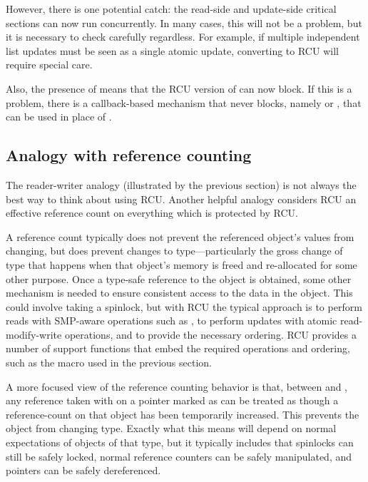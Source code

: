 However, there is one potential catch{:} the read-side and update-side
critical sections can now run concurrently.
In many cases, this will
not be a problem, but it is necessary to check carefully regardless.
For example, if multiple independent list updates must be seen as
a single atomic update, converting to RCU will require special care.

Also, the presence of  means that the RCU version of
 can now block.
If this is a problem, there is a callback-based
mechanism that never blocks, namely  or , that can
be used in place of .


\subsection{Analogy with reference counting}
\label{sec:rcu:Analogy with reference counting}

The reader-writer analogy (illustrated by the previous section) is not
always the best way to think about using RCU\@.
Another helpful analogy
considers RCU an effective reference count on everything which is
protected by RCU\@.

A reference count typically does not prevent the referenced object's
values from changing, but does prevent changes to type---particularly the
gross change of type that happens when that object's memory is freed and
re-allocated for some other purpose.
Once a type-safe reference to the
object is obtained, some other mechanism is needed to ensure consistent
access to the data in the object.
This could involve taking a spinlock,
but with RCU the typical approach is to perform reads with SMP-aware
operations such as , to perform updates with atomic
read-modify-write operations, and to provide the necessary ordering.
RCU provides a number of support functions that embed the required
operations and ordering, such as the  macro
used in the previous section.

A more focused view of the reference counting behavior is that,
between  and , any reference taken with
 on a pointer marked as  can be treated as
though a reference-count on that object has been temporarily increased.
This prevents the object from changing type.
Exactly what this means
will depend on normal expectations of objects of that type, but it
typically includes that spinlocks can still be safely locked, normal
reference counters can be safely manipulated, and  pointers
can be safely dereferenced.

